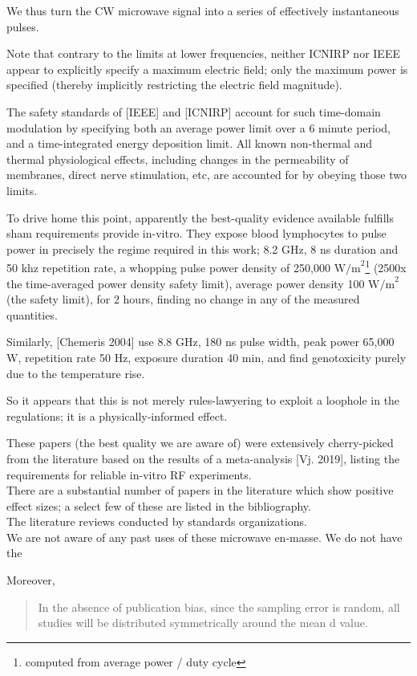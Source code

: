 \documentclass[fleqn,10pt]{article}
\begin{document}
We thus turn the CW microwave signal into a series of effectively instantaneous pulses.

Note that contrary to the limits at lower frequencies, neither ICNIRP nor IEEE appear to explicitly specify a maximum electric field; only the maximum power is specified (thereby implicitly restricting the electric field magnitude).

The safety standards of [IEEE] and [ICNIRP] account for such time-domain modulation by specifying both an average power limit over a 6 minute period, and a time-integrated energy deposition limit. All known non-thermal and thermal physiological effects, including changes in the permeability of membranes, direct nerve stimulation, etc, are accounted for by obeying those two limits.

To drive home this point, apparently the best-quality evidence available fulfills sham requirements provide in-vitro. They expose blood lymphocytes to pulse power in precisely the regime required in this work; 8.2 GHz, 8 ns duration and 50 khz repetition rate, a whopping pulse power density of 250,000 $\text{W/m}^2$\footnote{computed from average power / duty cycle} (2500x the time-averaged power density safety limit), average power density 100 $\text{W/m}^2$ (the safety limit), for 2 hours, finding no change in any of the measured quantities. 

Similarly, [Chemeris 2004] use 8.8 GHz, 180 ns pulse width, peak power 65,000 W, repetition rate 50 Hz, exposure duration 40 min, and find genotoxicity purely due to the temperature rise.

So it appears that this is not merely rules-lawyering to exploit a loophole in the regulations; it is a physically-informed effect.

\begin{autem}

These papers (the best quality we are aware of) were extensively cherry-picked from the literature based on the results of a meta-analysis [Vj. 2019], listing the requirements for reliable in-vitro RF experiments.\\


There are a substantial number of papers in the literature which show positive effect sizes; a select few of these are listed in the bibliography. \\

The literature reviews conducted by standards organizations.\\

We are not aware of any past uses of these microwave en-masse. We do not have the 

Moreover, 
\begin{quote}
	
In the absence of publication bias, since the sampling error is random, all studies will be distributed symmetrically around the mean d value.

\end{quote}


\end{autem}
\end{document}
